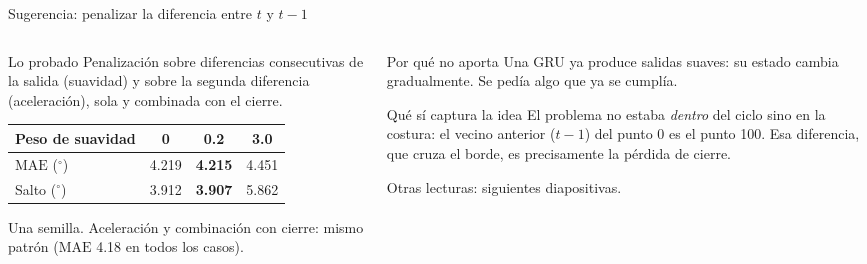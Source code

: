 \documentclass[aspectratio=169,10pt,t]{beamer}
\newcommand{\gr}{$^\circ$}
\newcommand{\mae}{\ensuremath{\mathrm{MAE}}}
\begin{document}
\begin{frame}{Sugerencia: penalizar la diferencia entre $t$ y $t-1$}
\begin{columns}[T]
\begin{column}{0.5\textwidth}
\begin{block}{Lo probado}
Penalización sobre diferencias consecutivas de la salida (suavidad) y sobre la segunda diferencia (aceleración), sola y combinada con el cierre.
\end{block}
\small
\begin{tabular}{lccc}
\toprule
Peso de suavidad & 0 & 0.2 & 3.0\\
\midrule
\mae{} (\gr) & 4.219 & \textbf{4.215} & 4.451\\
Salto (\gr) & 3.912 & \textbf{3.907} & 5.862\\
\bottomrule
\end{tabular}

\vspace{4pt}
{\scriptsize Una semilla. Aceleración y combinación con cierre: mismo patrón (\mae{} 4.18 en todos los casos).}
\end{column}
\begin{column}{0.47\textwidth}
\begin{alertblock}{Por qué no aporta}
Una GRU ya produce salidas suaves: su estado cambia gradualmente. Se pedía algo que ya se cumplía.
\end{alertblock}
\begin{exampleblock}{Qué sí captura la idea}
El problema no estaba \emph{dentro} del ciclo sino en la \alert{costura}: el vecino anterior ($t-1$) del punto 0 es el punto 100. Esa diferencia, que cruza el borde, es precisamente la pérdida de cierre.
\end{exampleblock}
{\scriptsize Otras lecturas: siguientes diapositivas.}
\end{column}
\end{columns}
\end{frame}
\end{document}
